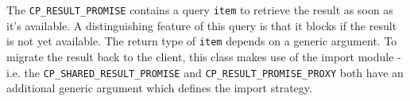 The \lstinline!CP_RESULT_PROMISE! contains a query \lstinline!item! to retrieve the result as soon as it's available.
A distinguishing feature of this query is that it blocks if the result is not yet available.
The return type of \lstinline!item! depends on a generic argument.
To migrate the result back to the client, this class makes use of the import module - i.e. the \lstinline!CP_SHARED_RESULT_PROMISE! and \lstinline!CP_RESULT_PROMISE_PROXY! both have an additional generic argument which defines the import strategy.


% 
% 
% 
% 
% 
% 
